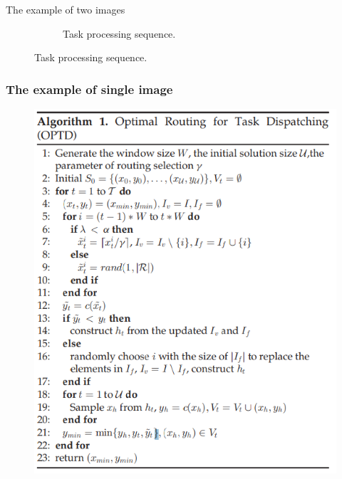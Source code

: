 \documentclass{../../../Cls/SDU/Beamer/Beamer}
\begin{document}
\begin{frame}{The example of two images}
\begin{figure}[htb]
\begin{subfigure}{.45\textwidth}
            \caption{Task processing sequence.} %
            \label{fig:logob} %
        \end{subfigure}
    \end{figure}
\end{frame}

\begin{frame}
    \frametitle{The example of single image} %

    \begin{figure}[htpb] %
        \centering %
        { %
            \includegraphics[scale=0.3]{Images/algorithm1.png} %
        }
        \label{fig:algorithm1} %
    \end{figure}

\end{frame}
\end{document}
